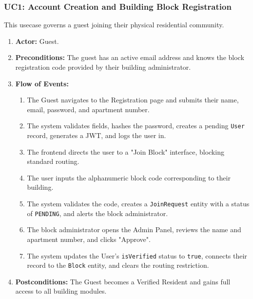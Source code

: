 \subsubsection{UC1: Account Creation and Building Block Registration}
This usecase governs a guest joining their physical residential community.
\begin{enumerate}
    \item \textbf{Actor:} Guest.
    \item \textbf{Preconditions:} The guest has an active email address and knows the block registration code provided by their building administrator.
    \item \textbf{Flow of Events:}
    \begin{enumerate}
        \item The Guest navigates to the Registration page and submits their name, email, password, and apartment number.
        \item The system validates fields, hashes the password, creates a pending \texttt{User} record, generates a JWT, and logs the user in.
        \item The frontend directs the user to a "Join Block" interface, blocking standard routing.
        \item The user inputs the alphanumeric block code corresponding to their building.
        \item The system validates the code, creates a \texttt{JoinRequest} entity with a status of \texttt{PENDING}, and alerts the block administrator.
        \item The block administrator opens the Admin Panel, reviews the name and apartment number, and clicks "Approve".
        \item The system updates the User's \texttt{isVerified} status to \texttt{true}, connects their record to the \texttt{Block} entity, and clears the routing restriction.
    \end{enumerate}
    \item \textbf{Postconditions:} The Guest becomes a Verified Resident and gains full access to all building modules.
\end{enumerate}

